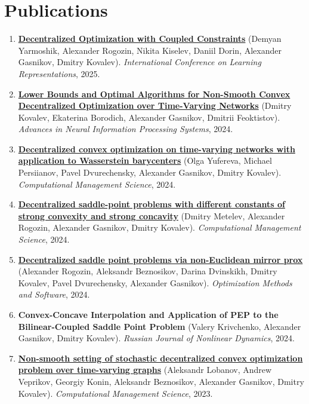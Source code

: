 \section{Publications}
\begin{enumerate}
\item
\textbf{\href{https://arxiv.org/abs/2407.02020}{Decentralized Optimization with Coupled Constraints}} (Demyan Yarmoshik, Alexander Rogozin, Nikita Kiselev, Daniil Dorin, Alexander Gasnikov, Dmitry Kovalev). \textit{International Conference on Learning Representations}, 2025.
\item
\textbf{\href{https://arxiv.org/abs/2405.18031}{Lower Bounds and Optimal Algorithms for Non-Smooth Convex Decentralized Optimization over Time-Varying Networks}} (Dmitry Kovalev, Ekaterina Borodich, Alexander Gasnikov, Dmitrii Feoktistov). \textit{Advances in Neural Information Processing Systems}, 2024.
\item
\textbf{\href{https://link.springer.com/article/10.1007/s10287-023-00493-9}{Decentralized convex optimization on time-varying networks with application to Wasserstein barycenters}} (Olga Yufereva, Michael Persiianov, Pavel Dvurechensky, Alexander Gasnikov, Dmitry Kovalev). \textit{Computational Management Science}, 2024.
\item
\textbf{\href{https://link.springer.com/article/10.1007/s10287-023-00485-9}{Decentralized saddle-point problems with different constants of strong convexity and strong concavity}} (Dmitry Metelev, Alexander Rogozin, Alexander Gasnikov, Dmitry Kovalev). \textit{Computational Management Science}, 2024.
\item
\textbf{\href{https://www.tandfonline.com/doi/abs/10.1080/10556788.2023.2280062}{Decentralized saddle point problems via non-Euclidean mirror prox}} (Alexander Rogozin, Aleksandr Beznosikov, Darina Dvinskikh, Dmitry Kovalev, Pavel Dvurechensky, Alexander Gasnikov). \textit{Optimization Methods and Software}, 2024.
\item
\textbf{Convex-Concave Interpolation and Application of PEP to the Bilinear-Coupled Saddle Point Problem} (Valery Krivchenko, Alexander Gasnikov, Dmitry Kovalev). \textit{Russian Journal of Nonlinear Dynamics}, 2024.
\item
\textbf{\href{https://link.springer.com/article/10.1007/s10287-023-00479-7}{Non-smooth setting of stochastic decentralized convex optimization problem over time-varying graphs}} (Aleksandr Lobanov, Andrew Veprikov, Georgiy Konin, Aleksandr Beznosikov, Alexander Gasnikov, Dmitry Kovalev). \textit{Computational Management Science}, 2023.

\end{enumerate}
